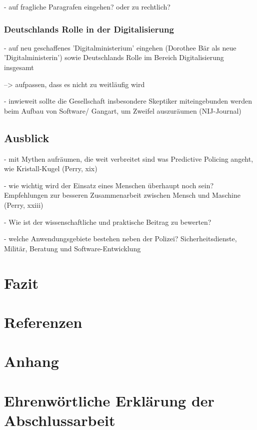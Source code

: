 \documentclass[a4paper,12pt,parskip,bibtotoc,liststotoc]{article}
\begin{document}
- auf fragliche Paragrafen eingehen? oder zu rechtlich? 


\subsubsection{Deutschlands Rolle in der Digitalisierung}

- auf neu geschaffenes 'Digitalministerium' eingehen (Dorothee Bär als neue 'Digitalministerin') sowie Deutschlands Rolle im Bereich Digitalisierung insgesamt 

--> aufpassen, dass es nicht zu weitläufig wird

- inwieweit sollte die Gesellschaft insbesondere Skeptiker miteingebunden werden beim Aufbau von Software/ Gangart, um Zweifel auszuräumen (NIJ-Journal)



\subsection{Ausblick}
- mit Mythen aufräumen, die weit verbreitet sind was Predictive Policing angeht, wie Kristall-Kugel (Perry, xix)

- wie wichtig wird der Einsatz eines Menschen überhaupt noch sein? Empfehlungen zur besseren Zusammenarbeit zwischen Mensch und Maschine (Perry, xxiii) 

- Wie ist der wissenschaftliche und praktische Beitrag zu bewerten?

- welche Anwendungsgebiete bestehen neben der Polizei? Sicherheitsdienste, Militär, Beratung und Software-Entwicklung

\newpage
\section{Fazit}

\section*{Referenzen}

\section{Anhang}

\section{Ehrenwörtliche Erklärung der Abschlussarbeit}
\end{document}
